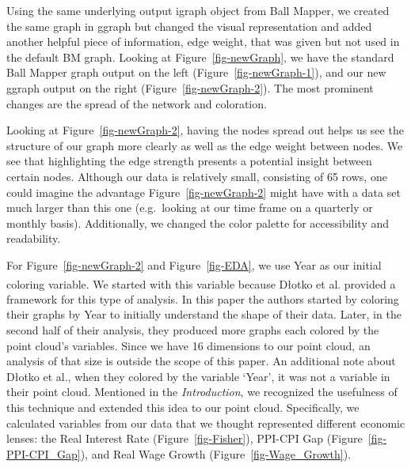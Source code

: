 \documentclass[
  10pt,
  letterpaper,
  DIV=11,
  numbers=noendperiod]{scrartcl}
\begin{document}
Using the same underlying output igraph object from Ball Mapper, we
created the same graph in ggraph but changed the visual representation
and added another helpful piece of information, edge weight, that was
given but not used in the default BM graph. Looking at
Figure~\ref{fig-newGraph}, we have the standard Ball Mapper graph output
on the left (Figure~\ref{fig-newGraph-1}), and our new ggraph output on
the right (Figure~\ref{fig-newGraph-2}). The most prominent changes are
the spread of the network and coloration.

Looking at Figure~\ref{fig-newGraph-2}, having the nodes spread out
helps us see the structure of our graph more clearly as well as the edge
weight between nodes. We see that highlighting the edge strength
presents a potential insight between certain nodes. Although our data is
relatively small, consisting of 65 rows, one could imagine the advantage
Figure~\ref{fig-newGraph-2} might have with a data set much larger than
this one (e.g.~looking at our time frame on a quarterly or monthly
basis). Additionally, we changed the color palette for accessibility and
readability.

For Figure~\ref{fig-newGraph-2} and Figure~\ref{fig-EDA}, we use Year as
our initial coloring variable. We started with this variable because
D\l{}otko et
al.\textsuperscript{}
provided a framework for this type of analysis. In this paper the
authors started by coloring their graphs by Year to initially understand
the shape of their data. Later, in the second half of their analysis,
they produced more graphs each colored by the point cloud's variables.
Since we have 16 dimensions to our point cloud, an analysis of that size
is outside the scope of this paper. An additional note about D\l{}otko
et al., when they colored by the variable `Year', it was not a variable
in their point cloud. Mentioned in the \emph{Introduction}, we
recognized the usefulness of this technique and extended this idea to
our point cloud. Specifically, we calculated variables from our data
that we thought represented different economic lenses: the Real Interest
Rate (Figure~\ref{fig-Fisher}), PPI-CPI Gap
(Figure~\ref{fig-PPI-CPI_Gap}), and Real Wage Growth
(Figure~\ref{fig-Wage_Growth}).
\end{document}
